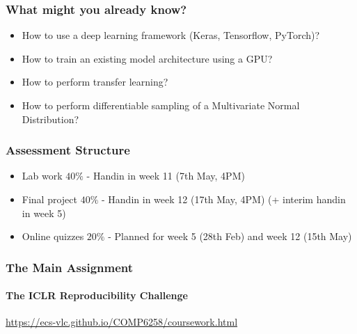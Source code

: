 \documentclass[]{article}
\begin{document}
\begin{frame}
	\frametitle{What might you already know?}
	\begin{itemize}
	\item<+-> How to use a deep learning framework (Keras, Tensorflow, PyTorch)?
	\item<+-> How to train an existing model architecture using a GPU?
	\item<+-> How to perform transfer learning?
	\item<+-> How to perform differentiable sampling of a Multivariate Normal Distribution?
	\end{itemize}
\end{frame}

\begin{frame}
	\frametitle{Assessment Structure}
	\begin{itemize}
		\item Lab work $40\%$ - Handin in week 11 (7th May, 4PM)
		\item Final project $40\%$  - Handin in week 12 (17th May, 4PM) (+ interim handin in week 5)
		\item Online quizzes $20\%$ - Planned for week 5 (28th Feb) and week 12 (15th May)
	\end{itemize}
\end{frame}




\begin{frame}
	\frametitle{The Main Assignment}
	\framesubtitle{The ICLR Reproducibility Challenge}
	\url{https://ecs-vlc.github.io/COMP6258/coursework.html}
\end{frame}
\end{document}
